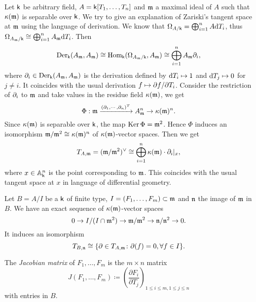     Let \(\kk\) be arbitrary field, \(A = \kk[T_1, \ldots, T_n]\) and \(\frakm\) a maximal ideal of \(A\) such that \(\rkk(\frakm)\) is separable over \(\kk\).
    We try to give an explanation of Zariski's tangent space at \(\frakm\) using the language of derivation.
    We know that \( \Omega_{A/\kk} = \bigoplus_{i=1}^n A \d T_i \), thus \(\Omega_{A_\frakm/\kk} \cong \bigoplus_{i=1}^n A_\frakm \d T_i\). 
    Then 
    \[ \Der_\kk(A_\frakm, A_\frakm) \cong \Hom_\kk(\Omega_{A_\frakm/\kk}, A_\frakm) \cong \bigoplus_{i=1}^n A_\frakm \P_i, \]
    where \(\P_i \in \Der_\kk(A_\frakm, A_\frakm)\) is the derivation defined by \(\d T_i \mapsto 1\) and \(\d T_j \mapsto 0\) for \(j \neq i\).
    It coincides with the usual derivation \(f \mapsto \P f/ \P T_i\).
    Consider the restriction of \(\P_i\) to \(\frakm\) and take values in the residue field \(\rkk(\frakm)\), we get 
    \[ \Phi : \frakm \xrightarrow{(\P_1,\cdots,\P_n)^T} A_\frakm^n \to \rkk(\frakm)^n.\]
    Since \(\rkk(\frakm)\) is separable over \(\kk\), the map \(\Ker \Phi = \frakm^2\).
    Hence \(\Phi\) induces an isomorphism \( \frakm/{\frakm^2} \cong \rkk(\frakm)^n \) of \(\rkk(\frakm)\)-vector spaces.
    Then we get 
    \[ T_{A,\frakm} = (\frakm/\frakm^2)^\lor \cong \bigoplus_{i=1}^n \rkk(\frakm)\cdot \P_i|_x, \]
    where \(x \in \bba_\kk^n\) is the point corresponding to \(\frakm\).
    This coincides with the usual tangent space at \(x\) in language of differential geometry.

    Let \(B = A/I\) be a \(\kk\) of finite type, \(I = (F_1,\ldots,F_m) \subset \frakm\) and \(\frakn\) the image of \(\frakm\) in \(B\).
    We have an exact sequence of \(\rkk(\frakm)\)-vector spaces
    \[ 0 \to I/(I\cap \frakm^2) \to \frakm/\frakm^2 \to \frakn/\frakn^2 \to 0. \]
    It induces an isomorphism
    \[ T_{B,\frakn} \cong \{ \P \in T_{A,\frakm} \colon \P(f) = 0, \forall f \in I \}. \] 

    The \emph{Jacobian matrix} of \(F_1, \ldots, F_m\) is the \(m \times n\) matrix
    \[
        J(F_1, \ldots, F_m) \coloneqq \left( \frac{\partial F_i}{\partial T_j} \right)_{1 \leq i \leq m, 1 \leq j \leq n}
    \] 
    with entries in \(B\).

